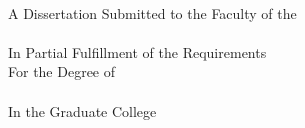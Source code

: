 \begin{titlepage}
    \begin{addmargin}[-1cm]{-3cm}
    \begin{center}
        \large  
        \hfill
        \vfill
        \begingroup
            \color{Maroon}\spacedallcaps{\myTitle} \\ \bigskip
        \endgroup
        \spacedlowsmallcaps{\myName}

        \vfill

        A Dissertation Submitted to the Faculty of the \\
        \spacedlowsmallcaps{\myDepartment} \\
        In Partial Fulfillment of the Requirements\\
        For the Degree of\\
        \spacedlowsmallcaps{ \myDegree } \\
        In the Graduate College\\
        \myUni \\ \bigskip
        \myTime
    \end{center}  
  \end{addmargin}       
\end{titlepage}   
